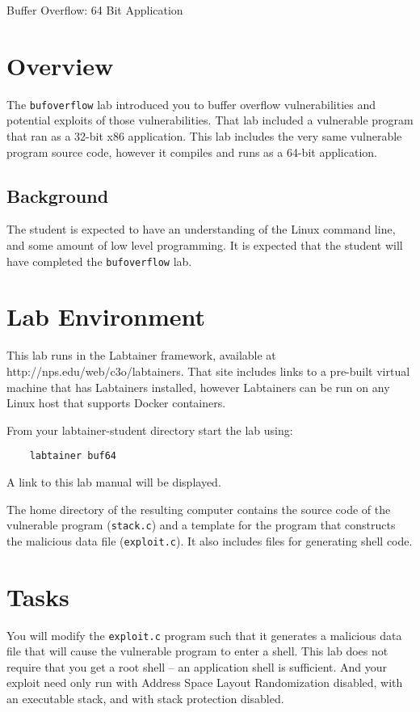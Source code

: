 


\begin{center}
{\LARGE Buffer Overflow: 64 Bit Application}
\vspace{0.1in}\\
\end{center}

\section{Overview}
The {\tt bufoverflow} lab introduced you to buffer overflow vulnerabilities and potential exploits of those
vulnerabilities.  That lab included a vulnerable program that ran as a 32-bit x86 application.  
This lab includes the very same vulnerable program source code, however it compiles and runs as a 64-bit application.

\subsection {Background}
The student is expected to have an understanding of the Linux command line, and some amount of low level programming.
It is expected that the student will have completed the {\tt bufoverflow} lab.

\section{Lab Environment}
\label{environment}
This lab runs in the Labtainer framework,
available at http://nps.edu/web/c3o/labtainers.
That site includes links to a pre-built virtual machine
that has Labtainers installed, however Labtainers can
be run on any Linux host that supports Docker containers.

From your labtainer-student directory start the lab using:
\begin{verbatim}
    labtainer buf64
\end{verbatim}
\noindent A link to this lab manual will be displayed.  

The home directory of the resulting computer contains the source code of the vulnerable program ({\tt stack.c}) and
a template for the program that constructs the malicious data file ({\tt exploit.c}).  It also includes files for generating
shell code.  

\section{Tasks}
You will modify the {\tt exploit.c} program such that it generates a malicious data file that will cause the
vulnerable program to enter a shell.  This lab does not require that you get a root shell -- an application shell
is sufficient.  And your exploit need only run with Address Space Layout Randomization disabled, with an executable
stack, and with stack protection disabled.

